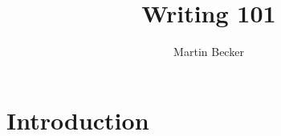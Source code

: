 \documentclass[a4paper]{memoir}
\title{Writing 101}
\author{Martin Becker}
\begin{document}
\chapter{Introduction}

\end{document}
